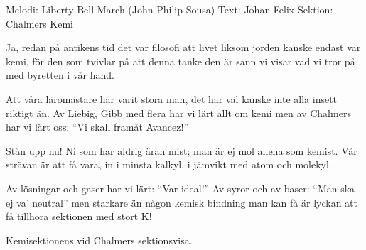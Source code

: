 \begin{song}

\begin{songmeta}
Melodi: Liberty Bell March (John Philip Sousa)
Text: Johan Felix
Sektion: Chalmers Kemi
\end{songmeta}

\begin{songtext}
Ja, redan på antikens tid det var filosofi
att livet liksom jorden kanske endast var kemi,
för den som tvivlar på att denna tanke den är sann
vi visar vad vi tror på med byretten i vår hand.

Att våra läromästare har varit stora män,
det har väl kanske inte alla insett riktigt än.
Av Liebig, Gibb med flera har vi lärt allt om kemi
men av Chalmers har vi lärt oss:
\textquotedblleft{}Vi skall framåt Avancez!\textquotedblright{}

Stån upp nu! Ni som har aldrig äran mist;
man är ej mol allena som kemist.
Vår strävan är att få vara, in i minsta kalkyl,
i jämvikt med atom och molekyl.

Av lösningar och gaser har vi lärt: \textquotedblleft{}Var ideal!\textquotedblright{}
Av syror och av baser: \textquotedblleft{}Man ska ej va' neutral\textquotedblright{}
men starkare än någon kemisk bindning man kan få
är lyckan att få tillhöra sektionen med stort K!
\end{songtext}

\begin{songnotes}
Kemisektionens vid Chalmers sektionsvisa.
\end{songnotes}

\end{song}
